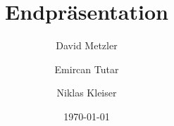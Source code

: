 \documentclass[aspectratio=169]{beamer}
\title[]{Endpräsentation}
\author[shortname]{David Metzler \and Emircan Tutar  \and Niklas Kleiser}
\institute[shortinst]{ Hochschule Ravensburg Weingraten\\ \smallskip}
\date{ \today}
\begin{document}

\begin{frame}
	\titlepage %
\end{frame}





\end{document}
